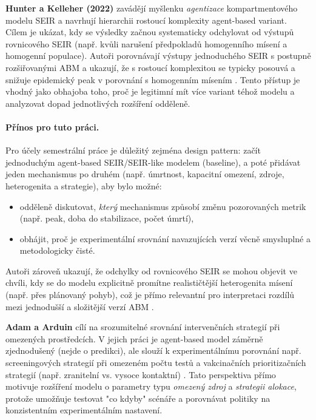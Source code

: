 \documentclass{article}
\begin{document}
\textbf{Hunter a Kelleher (2022)} zavádějí myšlenku \emph{agentizace} kompartmentového modelu SEIR a navrhují hierarchii rostoucí komplexity agent-based variant. Cílem je ukázat, kdy se výsledky začnou systematicky odchylovat od výstupů rovnicového SEIR (např. kvůli narušení předpokladů homogenního mísení a homogenní populace). Autoři porovnávají výstupy jednoduchého SEIR s postupně rozšiřovanými ABM a ukazují, že s rostoucí komplexitou se typicky posouvá a snižuje epidemický peak v porovnání s homogenním mísením \cite{hunter-kelleher-2022}. Tento přístup je vhodný jako obhajoba toho, proč je legitimní mít více variant téhož modelu a analyzovat dopad jednotlivých rozšíření odděleně.

\paragraph{Přínos pro tuto práci.} Pro účely semestrální práce je důležitý zejména design pattern: začít jednoduchým agent-based SEIR/SEIR-like modelem (baseline), a poté přidávat jeden mechanismus po druhém (např. úmrtnost, kapacitní omezení, zdroje, heterogenita a strategie), aby bylo možné:
\begin{itemize}
\item odděleně diskutovat, \emph{který} mechanismus způsobí změnu pozorovaných metrik (např. peak, doba do stabilizace, počet úmrtí),
\item obhájit, proč je experimentální srovnání navazujících verzí věcně smysluplné a metodologicky čisté.
\end{itemize}
Autoři zároveň ukazují, že odchylky od rovnicového SEIR se mohou objevit ve chvíli, kdy se do modelu explicitně promítne realističtější heterogenita mísení (např. přes plánovaný pohyb), což je přímo relevantní pro interpretaci rozdílů mezi jednodušší a složitější verzí ABM \cite{hunter-kelleher-2022}.

\textbf{Adam a Arduin} cílí na srozumitelné srovnání intervenčních strategií při omezených prostředcích. V jejich práci je agent-based model záměrně zjednodušený (nejde o predikci), ale slouží k experimentálnímu porovnání např. screeningových strategií při omezeném počtu testů a vakcinačních prioritizačních strategií (např. zranitelní vs. vysoce kontaktní) \cite{adam-arduin-2022}. Tato perspektiva přímo motivuje rozšíření modelu o parametry typu \emph{omezený zdroj} a \emph{strategii alokace}, protože umožňuje testovat "co kdyby" scénáře a porovnávat politiky na konzistentním experimentálním nastavení.
\end{document}
